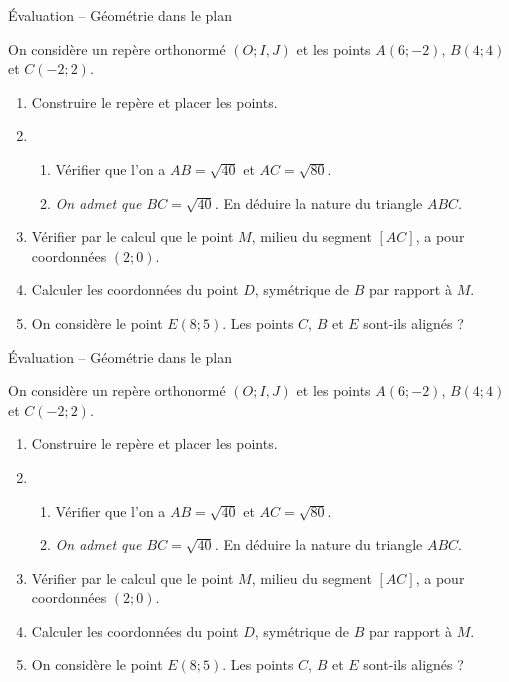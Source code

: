 \documentclass[11pt]{article}
\begin{document}
\begin{center}
  \LARGE Évaluation -- Géométrie dans le plan
\end{center}
\noindent On considère un repère orthonormé $(O; I, J)$ et les points $A(6;
-2)$, $B(4; 4)$ et $C(-2;2)$.
\begin{enumerate}
  \item Construire le repère et placer les points.
  \item \begin{enumerate}
      \item Vérifier que l'on a $AB=\sqrt{40}$ et $AC=\sqrt{80}$.
      \item \emph{On admet que $BC=\sqrt{40}$.} En déduire la nature du triangle $ABC$.
    \end{enumerate}
  \item Vérifier  par le calcul que le point $M$, milieu du segment $\left[ AC
    \right]$, a pour coordonnées $(2;0)$.
  \item Calculer les coordonnées du point $D$, symétrique de $B$ par rapport
    à $M$.
  \item On considère le point $E(8;5)$. Les points $C$, $B$ et $E$ sont-ils
    alignés ?
\end{enumerate}

\vspace{1.3cm}
\begin{center}
  \LARGE Évaluation -- Géométrie dans le plan
\end{center}
\noindent On considère un repère orthonormé $(O; I, J)$ et les points $A(6;
-2)$, $B(4; 4)$ et $C(-2;2)$.
\begin{enumerate}
  \item Construire le repère et placer les points.
  \item \begin{enumerate}
      \item Vérifier que l'on a $AB=\sqrt{40}$ et $AC=\sqrt{80}$.
      \item \emph{On admet que $BC=\sqrt{40}$.} En déduire la nature du triangle $ABC$.
    \end{enumerate}
  \item Vérifier  par le calcul que le point $M$, milieu du segment $\left[ AC
    \right]$, a pour coordonnées $(2;0)$.
  \item Calculer les coordonnées du point $D$, symétrique de $B$ par rapport
    à $M$.
  \item On considère le point $E(8;5)$. Les points $C$, $B$ et $E$ sont-ils
    alignés ?
\end{enumerate}
\end{document}
